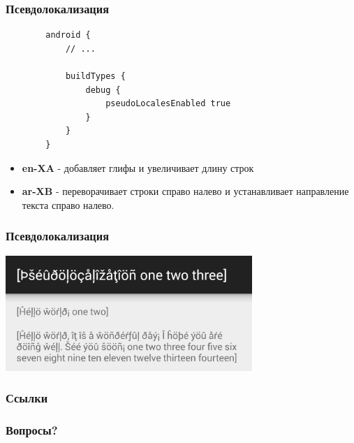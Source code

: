 \documentclass{beamer}
\begin{document}
\begin{frame}[fragile]
    \frametitle{Псевдолокализация}
    \begin{verbatim}
        android {
            // ...

            buildTypes {
                debug {
                    pseudoLocalesEnabled true
                }
            }
        }
    \end{verbatim}
    \begin{itemize}
        \item \textbf{en-XA} - добавляет глифы и увеличивает длину строк
        \item \textbf{ar-XB} - переворачивает строки справо налево и устанавливает
            направление текста справо налево.
    \end{itemize}
\end{frame}

\begin{frame}
    \frametitle{Псевдолокализация}
    \begin{center}
        \includegraphics[width=0.7\textwidth,keepaspectratio]{images/pseudolocalization}
    \end{center}
\end{frame}

\begin{frame}
    \frametitle{Ссылки}
    \nocite{*}
    \RaggedRight
    \AtNextBibliography{\scriptsize}
    \printbibliography[heading=none]
\end{frame}

\begin{frame}
    \frametitle{Вопросы?}
\end{frame}
\end{document}
